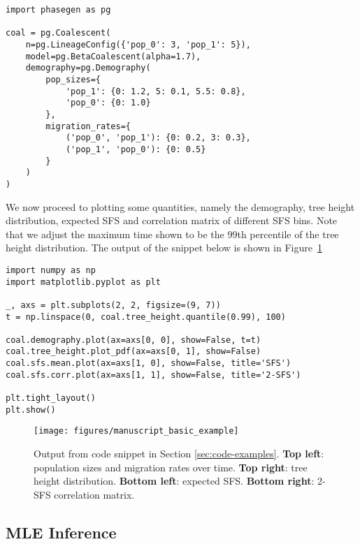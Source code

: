 \documentclass[hidelinks,11pt]{article}
\begin{document}
    \begin{verbatim}
import phasegen as pg

coal = pg.Coalescent(
    n=pg.LineageConfig({'pop_0': 3, 'pop_1': 5}),
    model=pg.BetaCoalescent(alpha=1.7),
    demography=pg.Demography(
        pop_sizes={
            'pop_1': {0: 1.2, 5: 0.1, 5.5: 0.8},
            'pop_0': {0: 1.0}
        },
        migration_rates={
            ('pop_0', 'pop_1'): {0: 0.2, 3: 0.3},
            ('pop_1', 'pop_0'): {0: 0.5}
        }
    )
)

    \end{verbatim}

    We now proceed to plotting some quantities, namely the demography, tree height distribution, expected SFS and correlation matrix of different SFS bins.
    Note that we adjust the maximum time shown to be the 99th percentile of the tree height distribution.
    The output of the snippet below is shown in Figure~\ref{fig:simple-example}

    \begin{verbatim}
import numpy as np
import matplotlib.pyplot as plt

_, axs = plt.subplots(2, 2, figsize=(9, 7))
t = np.linspace(0, coal.tree_height.quantile(0.99), 100)

coal.demography.plot(ax=axs[0, 0], show=False, t=t)
coal.tree_height.plot_pdf(ax=axs[0, 1], show=False)
coal.sfs.mean.plot(ax=axs[1, 0], show=False, title='SFS')
coal.sfs.corr.plot(ax=axs[1, 1], show=False, title='2-SFS')

plt.tight_layout()
plt.show()
    \end{verbatim}

    \begin{figure}[H]
        \centering
        \texttt{[image: figures/manuscript\_basic\_example]}
        \caption{
            Output from code snippet in Section \ref{sec:code-examples}.
            \textbf{Top left}: population sizes and migration rates over time.
            \textbf{Top right}: tree height distribution. \textbf{Bottom left}: expected SFS.
            \textbf{Bottom right}: 2-SFS correlation matrix.
        }
        \label{fig:simple-example}
    \end{figure}

    \subsection{MLE Inference}\label{subsec:mle-inference}
\end{document}
